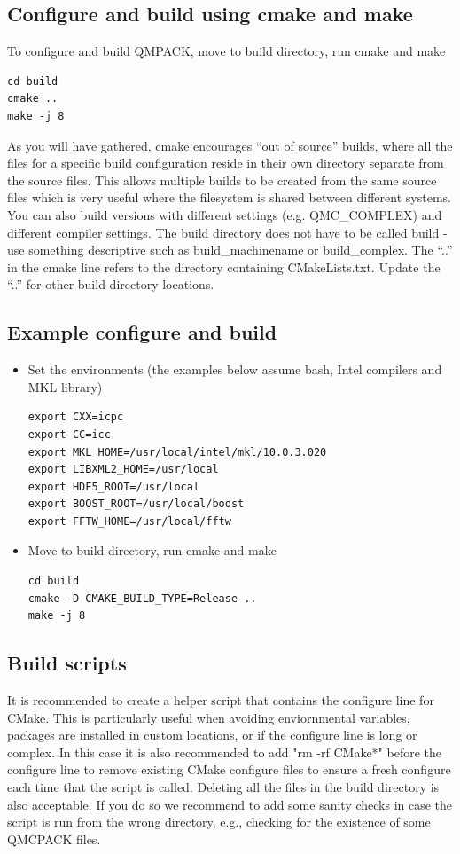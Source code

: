 \subsection{Configure and build using cmake and make}
To configure and build QMPACK, move to build directory, run cmake and make
\begin{verbatim}
cd build
cmake ..
make -j 8
\end{verbatim}

As you will have gathered, cmake encourages ``out of source'' builds,
where all the files for a specific build configuration reside in their
own directory separate from the source files. This allows multiple
builds to be created from the same source files which is very useful
where the filesystem is shared between different systems. You can also
build versions with different settings (e.g. QMC\_COMPLEX) and
different compiler settings. The build directory does not have to be
called build - use something descriptive such as build\_machinename or
build\_complex. The ``..'' in the cmake line refers to the directory
containing CMakeLists.txt. Update the ``..'' for other build 
directory locations.

\subsection{Example configure and build}
\begin{itemize}
\item Set the environments (the examples below assume bash, Intel compilers and MKL library)
\begin{verbatim}
export CXX=icpc
export CC=icc
export MKL_HOME=/usr/local/intel/mkl/10.0.3.020
export LIBXML2_HOME=/usr/local
export HDF5_ROOT=/usr/local
export BOOST_ROOT=/usr/local/boost
export FFTW_HOME=/usr/local/fftw
\end{verbatim}

\item Move to build directory, run cmake and make
\begin{verbatim}
cd build
cmake -D CMAKE_BUILD_TYPE=Release ..
make -j 8
\end{verbatim}
\end{itemize}

\subsection{Build scripts}
It is recommended to create a helper script that contains the
configure line for CMake.  This is particularly useful when avoiding
enviornmental variables, packages are installed in custom locations,
or if the configure line is long or complex.  In this case it is also
recommended to add "rm -rf CMake*" before the configure line to remove
existing CMake configure files to ensure a fresh configure each time
that the script is called. Deleting all the files in the build
directory is also acceptable. If you do so we recommend to add some sanity
checks in case the script is run from the wrong directory, e.g.,
checking for the existence of some QMCPACK files.


